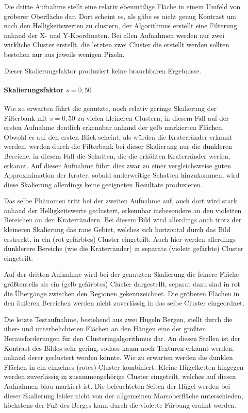 Die dritte Aufnahme stellt eine relativ ebenmäßige Fläche in einem Umfeld von gröberer Oberfläche dar. Dort scheint es, als gäbe es nicht genug Kontrast um nach den Helligkeitswerten zu clustern, der Algorithmus erstellt eine Filterung anhand der X- und Y-Koordinaten. Bei allen Aufnahmen werden nur zwei wirkliche Cluster erstellt, die letzten zwei Cluster die erstellt werden sollten bestehen nur aus jeweils wenigen Pixeln.

Dieser Skalierungsfaktor produziert keine brauchbaren Ergebnisse.

\paragraph{Skalierungsfaktor $s=0,50$}

Wie zu erwarten führt die genutzte, noch relativ geringe Skalierung der Filterbank mit $s=0,50$ zu vielen kleineren Clustern, in diesem Fall auf der ersten Aufnahme deutlich erkennbar anhand der gelb markierten Flächen. Obwohl es auf den ersten Blick scheint, als würden die Kraterränder erkannt werden, werden durch die Filterbank bei dieser Skalierung nur die dunkleren Bereiche, in diesem Fall die Schatten, die die erhöhten Kraterränder werfen, erkannt. Auf dieser Aufnahme führt dies zwar zu einer vergleichsweise guten Approxmimation der Krater, sobald anderweitige Schatten hinzukommen, wird diese Skalierung allerdings keine geeigneten Resultate produzieren.

Das selbe Phänomen tritt bei der zweiten Aufnahme auf, auch dort wird stark anhand der Helligkeitswerte geclustert, erkennbar insbesondere an den violetten Bereichen an den Kraterrändern. Bei diesem Bild wird allerdings auch trotz der kleineren Skalierung das raue Gebiet, welches sich horizontal durch das Bild erstreckt, in ein (rot gefärbtes) Cluster eingeteilt. Auch hier werden allerdings dunklerere Bereiche (wie die Kraterränder) in separate (violett gefärbte) Cluster eingeteilt.

Auf der dritten Aufnahme wird bei der genutzten Skalierung die feinere Fläche größtenteils als ein (gelb gefärbtes) Cluster dargestellt, separat dazu sind in rot die Übergänge zwischen den Regionen gekennzeichnet. Die gröberen Flächen in den äußeren Bereichen werden nicht zuverlässig in das selbe Cluster eingeordnet.

Die letzte Testaufnahme, bestehend aus zwei Hügeln \bzw Bergen, stellt durch die über- und unterbelichteten Flächen an den Hängen eine der größten Herausforderungen für den Clusteringalgorithmus dar. An diesen Stellen ist der Kontrast des Bildes sehr gering, sodass kaum noch Texturen erkannt werden, anhand derer geclustert werden könnte. Wie zu erwarten werden die dunklen Flächen in ein einzelnes (rotes) Cluster kombiniert. Kleine Hügelketten hingegen werden zuverlässig in zusammengehörige Cluster eingeteilt, welches auf diesen Aufnahmen blau markiert ist. Die beleuchteten Seiten der Hügel werden bei dieser Skalierung leider nicht von der allgemeinen Marsoberfläche unterschieden, höchstens der Fuß des Berges kann durch die violette Färbung erahnt werden.

